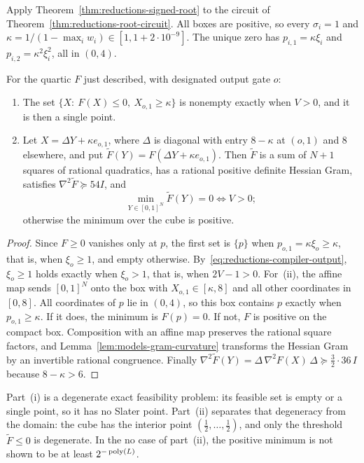 Apply Theorem~\ref{thm:reductions-signed-root} to the circuit of
Theorem~\ref{thm:reductions-root-circuit}. All boxes are positive, so every
$\sigma_i=1$ and $\kappa=1/(1-\max_iw_i)\in[1,1+2\cdot10^{-9}]$. The unique zero
has $p_{i,1}=\kappa\xi_i$ and $p_{i,2}=\kappa^2\xi_i^2$, all in $(0,4)$.

\begin{corollary}
\label{cor:reductions-feasibility}
For the quartic $F$ just described, with designated output gate $o$:
\begin{enumerate}[label=(\roman*)]
\item The set $\{X:\ F(X)\le0,\ X_{o,1}\ge\kappa\}$ is nonempty exactly when
$V>0$, and it is then a single point.
\item Let $X=\Delta Y+\kappa e_{o,1}$, where $\Delta$ is diagonal with entry $8-\kappa$ at
$(o,1)$ and $8$ elsewhere, and put $\widetilde F(Y)=F(\Delta Y+\kappa e_{o,1})$. Then
$\widetilde F$ is a sum of $N+1$ squares of rational quadratics, has a rational
positive definite Hessian Gram, satisfies $\nabla^2\widetilde F\succeq54I$, and
\[
 \min_{Y\in[0,1]^N}\widetilde F(Y)=0\iff V>0;
\]
otherwise the minimum over the cube is positive.
\end{enumerate}
\end{corollary}

\begin{proof}
Since $F\ge0$ vanishes only at $p$, the first set is $\{p\}$ when
$p_{o,1}=\kappa\xi_o\ge\kappa$, that is, when $\xi_o\ge1$, and empty
otherwise. By~\eqref{eq:reductions-compiler-output}, $\xi_o\ge1$ holds exactly
when $\xi_o>1$, that is, when $2V-1>0$. For~(ii), the affine map sends
$[0,1]^N$ onto the box with $X_{o,1}\in[\kappa,8]$ and all other coordinates in
$[0,8]$. All coordinates of $p$ lie in $(0,4)$, so this box contains $p$
exactly when $p_{o,1}\ge\kappa$. If it does, the minimum is $F(p)=0$. If not,
$F$ is positive on the compact box. Composition with an affine map preserves
the rational square factors, and Lemma~\ref{lem:models-gram-curvature}
transforms the Hessian Gram by an invertible rational congruence. Finally
$\nabla^2\widetilde F(Y)=\Delta\,\nabla^2F(X)\,\Delta\succeq\frac32\cdot36\,I$ because
$8-\kappa>6$.
\end{proof}

Part~(i) is a degenerate exact feasibility problem: its feasible set is
empty or a single point, so it has no Slater point. Part~(ii) separates that
degeneracy from the domain: the cube has the interior point
$(\frac12,\ldots,\frac12)$, and only the threshold $\widetilde F\le0$ is
degenerate. In the no case of part~(ii), the positive minimum is not shown to
be at least $2^{-\operatorname{poly}(L)}$.

